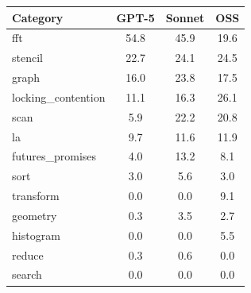 \begin{tabular}{lccc}
\toprule
Category & GPT-5 & Sonnet & OSS \\
\midrule
fft & 54.8 & 45.9 & 19.6 \\
stencil & 22.7 & 24.1 & 24.5 \\
graph & 16.0 & 23.8 & 17.5 \\
locking_contention & 11.1 & 16.3 & 26.1 \\
scan & 5.9 & 22.2 & 20.8 \\
la & 9.7 & 11.6 & 11.9 \\
futures_promises & 4.0 & 13.2 & 8.1 \\
sort & 3.0 & 5.6 & 3.0 \\
transform & 0.0 & 0.0 & 9.1 \\
geometry & 0.3 & 3.5 & 2.7 \\
histogram & 0.0 & 0.0 & 5.5 \\
reduce & 0.3 & 0.6 & 0.0 \\
search & 0.0 & 0.0 & 0.0 \\
\bottomrule
\end{tabular}
